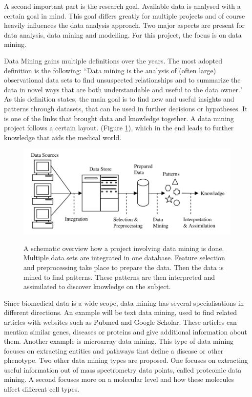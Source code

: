 \documentclass[10pt,a4paper]{article}
\begin{document}
	A second important part is the research goal. Available data is analysed with a certain goal in mind. This goal differs greatly for multiple projects and of course heavily influences the data analysis approach. Two major aspects are present for data analysis, data mining and modelling. For this project, the focus is on data mining.
	
	Data Mining gains multiple definitions over the years. The most adopted definition is the following: “Data mining is the analysis of (often large) observational data sets to find unsuspected relationships and to summarize the data in novel ways that are both understandable and useful to the data owner\cite{hand2001principles}." As this definition states, the main goal is to find new and useful insights and patterns through datasets, that can be used in further decisions or hypotheses\cite{chen2006medical, 7024124}. It is one of the links that brought data and knowledge together\cite{Yoo2012}. A data mining project follows a certain layout. (Figure \ref{fig:ResearchSteps}), which in the end leads to further knowledge that aids the medical world.\cite{bramer2007principles} 
	
	\begin{figure}
		\includegraphics[scale=1.0]{ResearchSteps.png}
		\label{fig:ResearchSteps}
		\caption{A schematic overview how a project involving data mining is done. Multiple data sets are integrated in one database. Feature selection and preprocessing take place to prepare the data. Then the data is mined to find patterns. These patterns are then interpreted and assimilated to discover knowledge on the subject\cite{bramer2007principles}.}
	\end{figure}
	
	Since biomedical data is a wide scope, data mining has several specialisations in different directions. An example will be text data mining, used to find related articles with websites such as Pubmed and Google Scholar. These articles can mention similar genes, diseases or proteins and give additional information about them. Another example is microarray data mining. This type of data mining focuses on extracting entities and pathways that define a disease or other phenotype. Two other data mining types are proposed. One focuses on extracting useful information out of mass spectrometry data points, called proteomic data mining. A second focuses more on a molecular level and how these molecules affect different cell types\cite{YANG2012S16}.
	
\end{document}
